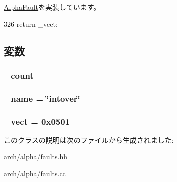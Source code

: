 \hyperlink{classAlphaISA_1_1AlphaFault_ac141ef2ab527bd4d5c079ddff2e8b4aa}{AlphaFault}を実装しています。


\begin{DoxyCode}
326 {return _vect;}
\end{DoxyCode}


\subsection{変数}
\hypertarget{classAlphaISA_1_1IntegerOverflowFault_a4bff925c412f331c5aaf6a39b79619ff}{
\subsubsection[{\_\-count}]{ {\bf \_\-count}}}
\label{classAlphaISA_1_1IntegerOverflowFault_a4bff925c412f331c5aaf6a39b79619ff}
\hypertarget{classAlphaISA_1_1IntegerOverflowFault_ac79073ffcd2c66a09bcd3bd3ad206019}{
\subsubsection[{\_\-name}]{ {\bf \_\-name} = \char`\"{}intover\char`\"{}}}
\label{classAlphaISA_1_1IntegerOverflowFault_ac79073ffcd2c66a09bcd3bd3ad206019}
\hypertarget{classAlphaISA_1_1IntegerOverflowFault_ad9e5855b9db0b2824cf6c507be4a872e}{
\subsubsection[{\_\-vect}]{ {\bf \_\-vect} = 0x0501}}
\label{classAlphaISA_1_1IntegerOverflowFault_ad9e5855b9db0b2824cf6c507be4a872e}


このクラスの説明は次のファイルから生成されました:\begin{DoxyCompactItemize}
\item 
arch/alpha/\hyperlink{arch_2alpha_2faults_8hh}{faults.hh}\item 
arch/alpha/\hyperlink{arch_2alpha_2faults_8cc}{faults.cc}\end{DoxyCompactItemize}
